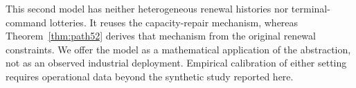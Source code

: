 This second model has neither heterogeneous renewal histories nor terminal-command lotteries. It reuses the capacity-repair mechanism, whereas Theorem~\ref{thm:path52} derives that mechanism from the original renewal constraints. We offer the model as a mathematical application of the abstraction, not as an observed industrial deployment. Empirical calibration of either setting requires operational data beyond the synthetic study reported here.
